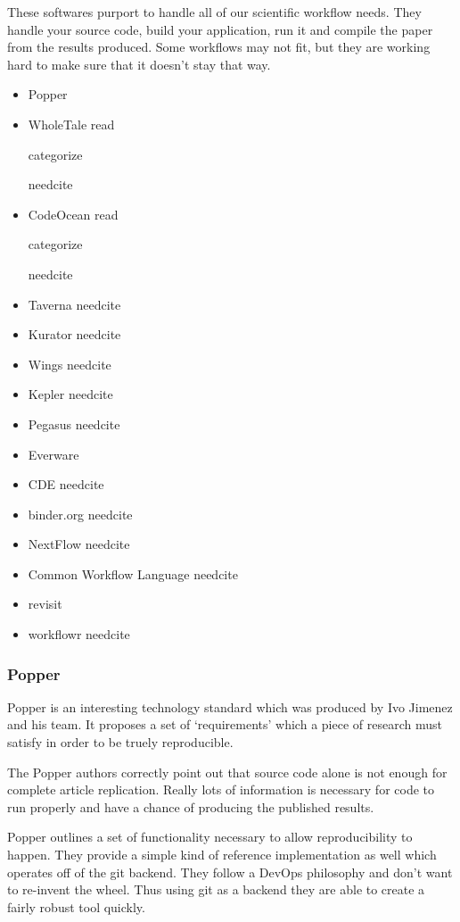 \documentclass[american]{article}
\newcommand{\Read}{
	\gls{read}
}
\newcommand{\categorize}{
	\gls{categorize}
}
\newcommand{\needcite}{
	\gls{needcite}
}
\begin{document}
These softwares purport to handle all of our scientific workflow needs. They handle your source code, build your application, run it and compile the paper from the results produced. Some workflows may not fit, but they are working hard to make sure that it doesn't stay that way.

\begin{itemize}
\item Popper \cite{popper}
\item WholeTale \Read \categorize \needcite
\item CodeOcean \Read \categorize \needcite
\item Taverna \needcite
\item Kurator \needcite
\item Wings \needcite
\item Kepler \needcite
\item Pegasus \needcite
\item Everware \cite{everware}
\item CDE \needcite
\item binder.org \needcite
\item NextFlow \needcite
\item Common Workflow Language \needcite
\item revisit \cite{matloff-revisit-2017}
\item workflowr \needcite
\end{itemize}

\subsubsection{Popper} \label{sec:software-managers-popper}

Popper \cite{popper} is an interesting technology standard which was produced by Ivo Jimenez and his team. It proposes a set of `requirements' which a piece of research must satisfy in order to be truely reproducible.

The Popper authors correctly point out that source code alone is not enough for complete article replication. Really lots of information is necessary for code to run properly and have a chance of producing the published results.

Popper outlines a set of functionality necessary to allow reproducibility to happen. They provide a simple kind of reference implementation as well which operates off of the git backend. They follow a DevOps philosophy and don't want to re-invent the wheel. Thus using git as a backend they are able to create a fairly robust tool quickly.
\end{document}
